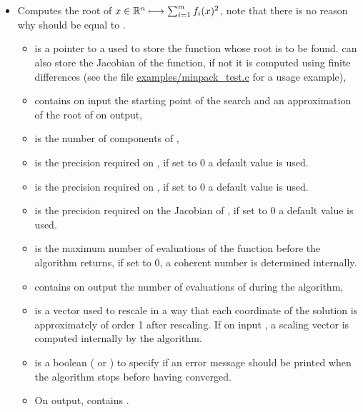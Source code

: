 \begin{itemize}
  \item {}
    \sshortdescribe Computes the root of $x \in {\mathbb R}^n \longmapsto
    \sum_{i=1}^m f_i(x)^2$, note that there is no reason why  should
    be equal to .
    \parameters
    \begin{itemize}
      \item {} is a pointer to a  used to
        store the function whose root is to be found.  can also
        store the Jacobian of the function, if not it is computed using
        finite differences (see the file \url{examples/minpack_test.c} for
        a usage example),
      \item  {} contains on input the starting
        point of the search and an approximation of the root of  on
        output,
      \item {} is the number of components of ,      
      \item {} is the precision required on , if set to 0 a
        default value is used.
      \item {} is the precision required on , if set to 0 a
        default value is used.
      \item {} is the precision required on the Jacobian of
        , if set to 0 a default value is used.
      \item {} is the maximum number of evaluations of the function
         before the algorithm returns, if set to 0, a coherent
        number is determined internally.
      \item {} contains on output the number of evaluations of
         during the algorithm,
      \item {} is a vector used to rescale  in a way that
        each coordinate of the solution is approximately of order 1 after
        rescaling.  If on input , a scaling vector is
        computed internally by the algorithm.
      \item {} is a boolean ( or ) to
        specify if an error message should be printed when the algorithm
        stops before having converged.
      \item On output,  contains .
    \end{itemize}
\end{itemize}

